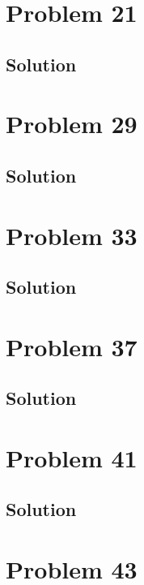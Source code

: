 \documentclass[12pt]{article}
\begin{document}
    \pagebreak
    \section{Problem 21}

        \subsection{Solution}

    \pagebreak
    \section{Problem 29}

        \subsection{Solution}

    \pagebreak
    \section{Problem 33}

        \subsection{Solution}

    \pagebreak
    \section{Problem 37}

        \subsection{Solution}

    \pagebreak
    \section{Problem 41}

        \subsection{Solution}

    \pagebreak
    \section{Problem 43}
\end{document}
